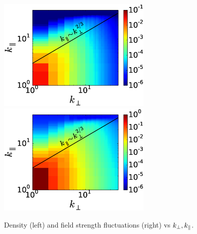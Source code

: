 \begin{figure}
\begin{center}
    \includegraphics[width=7.4cm]{figs/slowmodes/sw1_dne_kparkp.eps}
    \includegraphics[width=7.4cm]{figs/slowmodes/sw1_dbpar_kparkp.eps}
    \caption{Density (left) and field strength fluctuations (right) vs $k_\perp, k_\parallel$.}
\label{slowmodes:fig:dneanis} 
\end{center}
\end{figure}

